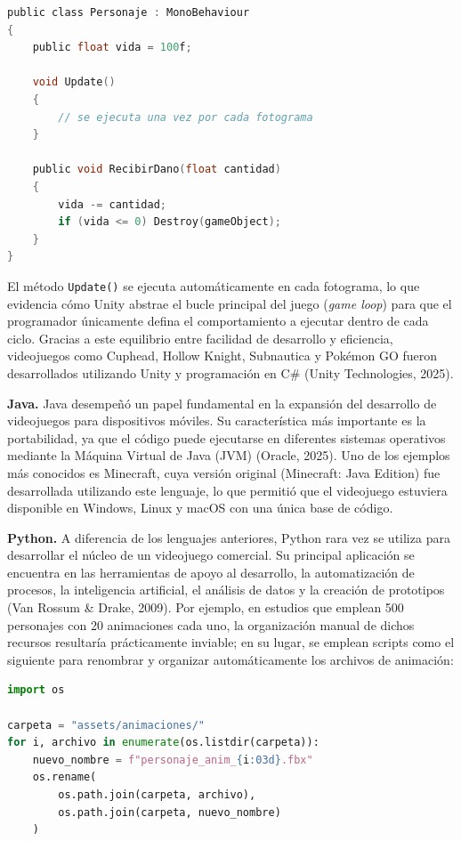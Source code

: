 \documentclass[12pt]{report}
\begin{document}
\begin{lstlisting}[language=C]
public class Personaje : MonoBehaviour
{
    public float vida = 100f;

    void Update()
    {
        // se ejecuta una vez por cada fotograma
    }

    public void RecibirDano(float cantidad)
    {
        vida -= cantidad;
        if (vida <= 0) Destroy(gameObject);
    }
}
\end{lstlisting}

El método \texttt{Update()} se ejecuta automáticamente en cada fotograma, lo que evidencia cómo Unity abstrae el bucle principal del juego (\textit{game loop}) para que el programador únicamente defina el comportamiento a ejecutar dentro de cada ciclo. Gracias a este equilibrio entre facilidad de desarrollo y eficiencia, videojuegos como Cuphead, Hollow Knight, Subnautica y Pokémon GO fueron desarrollados utilizando Unity y programación en C\# (Unity Technologies, 2025).

\textbf{Java.} Java desempeñó un papel fundamental en la expansión del desarrollo de videojuegos para dispositivos móviles. Su característica más importante es la portabilidad, ya que el código puede ejecutarse en diferentes sistemas operativos mediante la Máquina Virtual de Java (JVM) (Oracle, 2025). Uno de los ejemplos más conocidos es Minecraft, cuya versión original (Minecraft: Java Edition) fue desarrollada utilizando este lenguaje, lo que permitió que el videojuego estuviera disponible en Windows, Linux y macOS con una única base de código.

\textbf{Python.} A diferencia de los lenguajes anteriores, Python rara vez se utiliza para desarrollar el núcleo de un videojuego comercial. Su principal aplicación se encuentra en las herramientas de apoyo al desarrollo, la automatización de procesos, la inteligencia artificial, el análisis de datos y la creación de prototipos (Van Rossum \& Drake, 2009). Por ejemplo, en estudios que emplean 500 personajes con 20 animaciones cada uno, la organización manual de dichos recursos resultaría prácticamente inviable; en su lugar, se emplean scripts como el siguiente para renombrar y organizar automáticamente los archivos de animación:

\begin{lstlisting}[language=Python]
import os

carpeta = "assets/animaciones/"
for i, archivo in enumerate(os.listdir(carpeta)):
    nuevo_nombre = f"personaje_anim_{i:03d}.fbx"
    os.rename(
        os.path.join(carpeta, archivo),
        os.path.join(carpeta, nuevo_nombre)
    )
\end{lstlisting}
\end{document}
